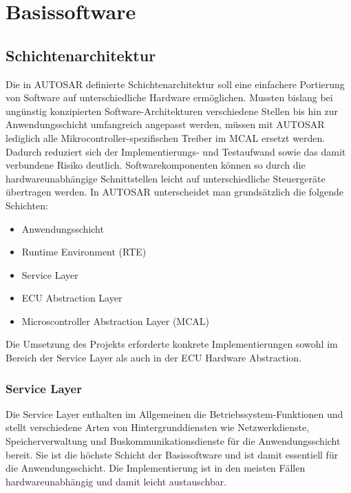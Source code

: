 \chapter{Basissoftware}
\section{Schichtenarchitektur}
Die in AUTOSAR definierte Schichtenarchitektur soll eine einfachere Portierung von Software auf unterschiedliche Hardware ermöglichen. Mussten bislang bei ungünstig konzipierten Software-Architekturen verschiedene Stellen bis hin zur Anwendungsschicht umfangreich angepasst werden, müssen mit AUTOSAR lediglich alle Mikrocontroller-spezifischen Treiber im MCAL ersetzt werden. Dadurch reduziert sich der Implementierungs- und Testaufwand sowie das damit verbundene Risiko deutlich. Softwarekomponenten können so durch die hardwareunabhängige Schnittstellen leicht auf unterschiedliche Steuergeräte übertragen werden.
In AUTOSAR unterscheidet man grundsätzlich die folgende Schichten:
\begin{itemize}
\item Anwendungsschicht
\item Runtime Environment (RTE)
\item Service Layer
\item ECU Abstraction Layer
\item Microscontroller Abstraction Layer (MCAL)
\end{itemize}
Die Umsetzung des Projekts erforderte konkrete Implementierungen sowohl im Bereich der Service Layer als auch in der ECU Hardware Abstraction.
\subsection{Service Layer}
Die Service Layer enthalten im Allgemeinen die Betriebssystem-Funktionen und stellt verschiedene Arten von Hintergrunddiensten wie Netzwerkdienste, Speicherverwaltung und Buskommunikationsdienste für die Anwendungsschicht bereit. Sie ist die höchste Schicht der Basissoftware und ist damit essentiell für die Anwendungsschicht. Die Implementierung ist in den meisten Fällen hardwareunabhängig und damit leicht austauschbar.
